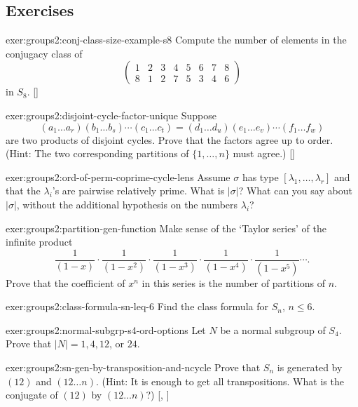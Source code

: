\subsection*{Exercises}

\begin{exer}{}{exer:groups2:conj-class-size-example-s8}
  \exerused{} Compute the number of elements in the conjugacy class of
  \[
    \begin{pmatrix}
      1 & 2 & 3 & 4 & 5 & 6 & 7 & 8 \\
      8 & 1 & 2 & 7 & 5 & 3 & 4 & 6
    \end{pmatrix}
  \]
  in $S_8$. []
\end{exer}
\begin{exer}{}{exer:groups2:disjoint-cycle-factor-unique}
  \exerused{} Suppose
  \[
    (a_1 \dots a_r)(b_1 \dots b_s) \cdots (c_1 \dots c_t) = (d_1 \dots
    d_u)(e_1 \dots e_v) \cdots (f_1 \dots f_w)
  \]
  are two products of disjoint cycles. Prove that the factors agree up
  to order. (Hint: The two corresponding partitions of
  $\{1, \dots, n\}$ must agree.) []
\end{exer}
\begin{exer}{}{exer:groups2:ord-of-perm-coprime-cycle-lens}
  Assume $\sigma$ has type $[\lambda_1, \dots, \lambda_r]$ and that
  the $\lambda_i$'s are pairwise relatively prime. What is $|\sigma|$?
  What can you say about $|\sigma|$, without the additional hypothesis
  on the numbers $\lambda_i$?
\end{exer}
\begin{exer}{}{exer:groups2:partition-gen-function}
  Make sense of the `Taylor series' of the infinite product
  \[
    \frac{1}{(1-x)} \cdot \frac{1}{(1-x^2)} \cdot \frac{1}{(1-x^3)}
    \cdot \frac{1}{(1-x^4)} \cdot \frac{1}{(1-x^5)} \cdots.
  \]
  Prove that the coefficient of $x^n$ in this series is the number of
  partitions of $n$.
\end{exer}
\begin{exer}{}{exer:groups2:class-formula-sn-leq-6}
  Find the class formula for $S_n$, $n \leq 6$.
\end{exer}
\begin{exer}{}{exer:groups2:normal-subgrp-s4-ord-options}
  Let $N$ be a normal subgroup of $S_4$. Prove that $|N| = 1, 4, 12$,
  or $24$.
\end{exer}
\begin{exer}{}{exer:groups2:sn-gen-by-transposition-and-ncycle}
  \exerused{} Prove that $S_n$ is generated by $(12)$ and
  $(12 \dots n)$.  (Hint: It is enough to get all transpositions. What
  is the conjugate of $(12)$ by $(12 \dots n)$?)
  [,
  ]
\end{exer}
